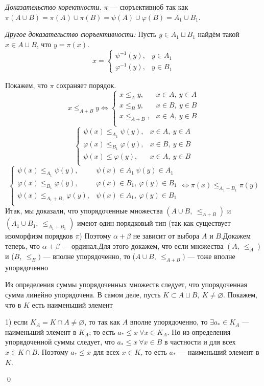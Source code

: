 \documentclass[12pt,oneside]{article}
\theoremstyle{definition}
\newenvironment{ourproof}[1]{\textit{Доказательство #1.}}{\qed}
\begin{document}
\begin{ourproof}{коректности}
$\pi$ --- сюръективноб так как $\pi(A\cup B) = \pi(A)\cup \pi(B) = \psi(A)\cup \varphi(B) = A_1\cup B_1$.

\textit{Другое доказательство сюръективности:}
Пусть $y\in A_1\sqcup B_1$ найдём такой $x\in A\sqcup B$, что $y=\pi(x)$.
$$x = 
\begin{cases}
\psi^{-1}(y), & y\in A_1\\
\varphi^{-1}(y), & y\in B_1
\end{cases}$$

Покажем, что $\pi$ сохраняет порядок.
$$x \leqslant_{A+B} y \Longleftrightarrow 
\begin{cases}
x \leqslant_A y, & x\in A,\ y\in A\\
x \leqslant_B y, & x\in B,\ y\in B\\
x \leqslant_{A+B}, & x\in A,\ y\in B\\
\end{cases}
$$
$$ \begin{cases}
\psi(x) \leqslant_{A_1} \psi(y), & x\in A,\ y\in A\\
\varphi(x) \leqslant_{B_1} \varphi(y), & x\in B,\ y\in B\\
\psi(x) \leqslant \varphi(y), & x\in A,\ y\in B\\
\end{cases}$$
$$ \begin{cases}
\psi(x) \leqslant_{A_1} \psi(y), & \psi(x)\in A_1\ \psi(y)\in A_1\\
\varphi(x) \leqslant_{B_1} \varphi(y), & \varphi(x)\in B_1,\ \varphi(y)\in B_1\\
\psi(x) \leqslant_{A_1+B_1} \varphi(y), & \psi(x)\in A_1,\ \varphi(y)\in B_1\\
\end{cases} \Longleftrightarrow \pi(x)\leqslant_{A_1+B_1} \pi(y)$$
Итак, мы доказали, что упорядоченные множества $(A\cup B,\ \leqslant_{A+B})$ и $(A_1\cup B_1,\ \leqslant_{A_1+B_1})$ имеют один порядковый тип (так как существует изоморфизм порядков $\pi$)
Поэтому $\alpha +\beta$ не зависит от выбора $A$ и $B$.Докажем теперь, что $\alpha + \beta$ --- ординал.Для этого докажем, что если множества $(A,\ \leqslant_A)$ и ($B,\ \leqslant_B)$ --- вполне упорядоченно, то ($A\cup B,\ \leqslant_{A+B})$ --- тоже вполне упорядоченно

Из определения суммы упорядоченных множеств следует, что упорядоченная сумма линейно упорядочена. В самом деле, пусть $K\subset A\sqcup B,\ K\neq\varnothing$. Покажем, что в $K$ есть наименьший элемент

1) если $K_A = K\cap A \neq \varnothing$, то так как $A$ вполне упорядоченно, то $\exists a_*\in K_A$ --- наименьший элемент в $K_A$; то есть $a_*\leqslant x\ \forall x\in K_A$. Но из определения упорядоченной суммы следует, что $a_* \leqslant x\ \forall x\in B$ в частности и для всех $x\in K\cap B$. Поэтому $a_*\leqslant x$ для всех $x\in K$, то есть $a_*$ --- наименьший элемент в $K$.


\end{ourproof}
\end{document}

